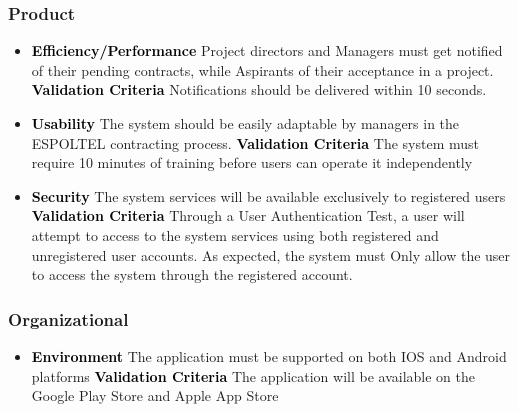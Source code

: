 \documentclass{scrreprt}
\begin{document}
\subsubsection{Product}
    \begin{itemize}
        \item \textcolor{black}{\textbf{Efficiency/Performance}}\newline
        Project directors and Managers must get notified of their pending contracts, while Aspirants of their acceptance in a project.\newline \newline
        \textcolor{black}{\textbf{Validation Criteria}}\newline
        Notifications should be delivered within 10 seconds.
        \item \textcolor{black}{\textbf{Usability}}\newline\newline
        The system should be easily adaptable by managers in the ESPOLTEL contracting process.\newline \newline
        \textcolor{black}{\textbf {Validation Criteria}} \newline
         The system must require 10 minutes of training before users can operate it independently\newline
           \item \textcolor{black} {\textbf{Security}}
        The system services will be available exclusively to registered users
        \newline \newline
        \textcolor{black}{\textbf{Validation Criteria}}\newline
            Through a User Authentication Test, a user will attempt to access to the system services using both registered and unregistered user accounts. As expected, the system must
            Only allow the user to access the system through the registered account.
    \end{itemize}
    
    
\subsubsection{Organizational}
    \begin{itemize}
        \item \textcolor{black}{\textbf {Environment}}\newline
        The application must be supported on both IOS and Android platforms \newline\newline
    \textcolor{black}{\textbf {Validation Criteria}} \newline
        The application will be available on the  Google Play Store and Apple App Store

    \end{itemize}
\end{document}

